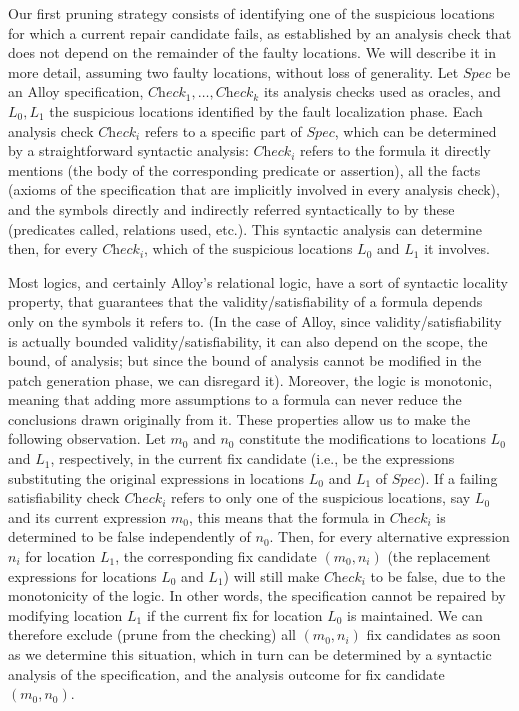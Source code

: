 Our first pruning strategy consists of identifying one of the suspicious locations for which a current repair candidate fails, as established by an analysis check that does not depend on the remainder of the faulty locations. We will describe it in more detail, assuming two faulty locations, without loss of generality. Let $\textit{Spec}$ be an Alloy specification, $\textit{Check}_1, \dots, \textit{Check}_k$ its analysis checks used as oracles, and $L_0, L_1$ the suspicious locations identified by the fault localization phase. Each analysis check $\textit{Check}_i$ refers to a specific part of $\textit{Spec}$, which can be determined by a straightforward syntactic analysis: $\textit{Check}_i$ refers to the formula it directly mentions (the body of the corresponding predicate or assertion), all the facts (axioms of the specification that are implicitly involved in every analysis check), and the symbols directly and indirectly referred syntactically to by these (predicates called, relations used, etc.). This syntactic analysis can determine then, for every $\textit{Check}_i$, which of the suspicious locations $L_0$ and $L_1$ it involves.

Most logics, and certainly Alloy's relational logic, have a sort of syntactic locality property, that guarantees that the validity/satisfiability of a formula depends only on the symbols it refers to. (In the case of Alloy, since validity/satisfiability is actually bounded validity/satisfiability, it can also depend on the scope, the bound, of analysis; but since the bound of analysis cannot be modified in the patch generation phase, we can disregard it). Moreover, the logic is monotonic, meaning that adding more assumptions to a formula can never reduce the conclusions drawn originally from it. These properties allow us to make the following observation. Let $m_0$ and $n_0$ constitute the modifications to locations $L_0$ and $L_1$, respectively, in the current fix candidate (i.e., be the expressions substituting the original expressions in locations $L_0$ and $L_1$ of $\textit{Spec}$). If a failing satisfiability check $\textit{Check}_i$ refers to only one of the suspicious locations, say $L_0$ and its current expression $m_0$, this means that the formula in $\textit{Check}_i$ is determined to be false independently of $n_0$. Then, for every alternative expression $n_i$ for location $L_1$, the corresponding fix candidate $(m_0, n_i)$ (the replacement expressions for locations $L_0$ and $L_1$) will still make $\textit{Check}_i$ to be false, due to the monotonicity of the logic. In other words, the specification cannot be repaired by modifying location $L_1$ if the current fix for location $L_0$ is maintained. We can therefore exclude (prune from the checking) all $(m_0, n_i)$ fix candidates as soon as we determine this situation, which in turn can be determined by a syntactic analysis of the specification, and the analysis outcome for fix candidate $(m_0, n_0)$. 


